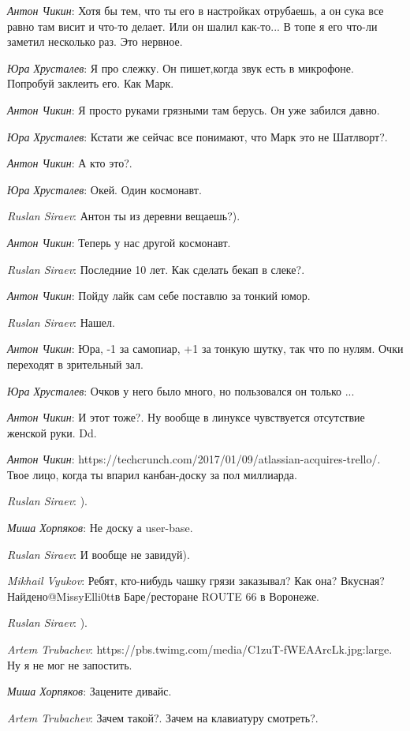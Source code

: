 \documentclass[10pt]{book}
\newcommand{\AUTHOR}[1]{\emph{#1}:}
\begin{document}
\AUTHOR{Антон Чикин} Хотя бы тем, что ты его в настройках отрубаешь, а он сука все равно там висит и что-то делает. Или он шалил как-то... В топе я его что-ли заметил несколько раз. Это нервное.

\AUTHOR{Юра Хрусталев} Я про слежку. Он пишет,когда звук есть в микрофоне. Попробуй заклеить его. Как Марк.

\AUTHOR{Антон Чикин} Я просто руками грязными там берусь. Он уже забился давно.

\AUTHOR{Юра Хрусталев} Кстати же сейчас все понимают, что Марк это не Шатлворт?.

\AUTHOR{Антон Чикин} А кто это?.

\AUTHOR{Юра Хрусталев} Окей. Один космонавт.

\AUTHOR{Ruslan Siraev} Антон ты из деревни вещаешь?).

\AUTHOR{Антон Чикин} Теперь у нас другой космонавт.

\AUTHOR{Ruslan Siraev} Последние 10 лет. Как сделать бекап в слеке?.

\AUTHOR{Антон Чикин} Пойду лайк сам себе поставлю за тонкий юмор.

\AUTHOR{Ruslan Siraev} Нашел.

\AUTHOR{Антон Чикин} Юра, -1 за самопиар, +1 за тонкую шутку, так что по нулям. Очки переходят в зрительный зал.

\AUTHOR{Юра Хрусталев} Очков у него было много, но пользовался он только ...

\AUTHOR{Антон Чикин} И этот тоже?. Ну вообще в линуксе чувствуется отсутствие женской руки. Dd.

\AUTHOR{Антон Чикин} https://techcrunch.com/2017/01/09/atlassian-acquires-trello/.  Твое лицо, когда ты впарил канбан-доску за пол миллиарда.

\AUTHOR{Ruslan Siraev} ).

\AUTHOR{Миша Хорпяков} Не доску а user-base.

\AUTHOR{Ruslan Siraev} И вообще не завидуй).

\AUTHOR{Mikhail Vyukov} Ребят, кто-нибудь чашку грязи заказывал? Как она? Вкусная? Найдено@MissyElli0ttв Баре/ресторане ROUTE 66 в Воронеже.

\AUTHOR{Ruslan Siraev} ).

\AUTHOR{Artem Trubachev} https://pbs.twimg.com/media/C1zuT-fWEAArcLk.jpg:large. Ну я не мог не запостить.

\AUTHOR{Миша Хорпяков}  Зацените дивайс.

\AUTHOR{Artem Trubachev} Зачем такой?. Зачем на клавиатуру смотреть?.
\end{document}
